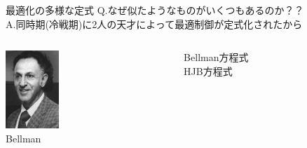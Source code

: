 \documentclass[twocolumn, dvipdfmx,12pt]{beamer}
\begin{document}
    \begin{frame}{最適化の多様な定式}
        \scriptsize
        Q.なぜ似たようなものがいくつもあるのか？？\\

        A.同時期(冷戦期)に2人の天才によって最適制御が定式化されたから\\

        \vspace{5mm}

        \begin{columns}

            \begin{column}{0.5\textwidth}
                \begin{boxnote}
                    \begin{columns}
                        \begin{column}{.5\textwidth}
                            \includegraphics[clip, width = 2.0cm]{Bellman.png}\\
                            {\tiny Bellman}
                            \centering
                        \end{column}
                        \begin{column}{.5\textwidth}
                            Bellman方程式 \\
                            HJB方程式 \\
                        \end{column}
                    \end{columns}
                \end{boxnote}
            \end{column}


\end{columns}
\end{frame}
\end{document}
